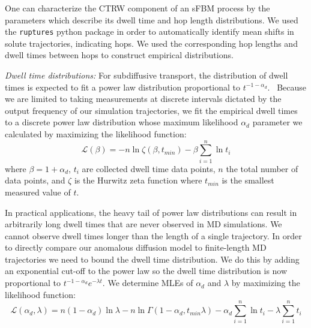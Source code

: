 \documentclass{article}
\begin{document}
  
  One can characterize the CTRW component of an sFBM process by the parameters which describe
  its dwell time and hop length distributions. We used the \texttt{ruptures} python
  package in order to automatically identify mean shifts in solute trajectories, 
  indicating hops.\cite{truong_ruptures:_2018} We used the corresponding hop lengths
  and dwell times between hops to construct empirical distributions.
  
  \textit{Dwell time distributions:} For subdiffusive transport, the distribution 
  of dwell times is expected to fit a power law distribution 
  proportional to $t^{-1-\alpha_d}$.~\cite{meroz_toolbox_2015}
  Because we are limited to taking measurements at discrete intervals dictated by the output 
  frequency of our simulation trajectories, we fit the empirical dwell times
  to a discrete power law distribution whose maximum likelihood $\alpha_d$ 
  parameter we calculated by maximizing the likelihood function: 
  \begin{equation}
	\mathcal{L}(\beta) = -n\ln \zeta(\beta, t_{min}) -
	\beta\sum_{i=1}^{n} \ln t_i 
  \label{eqn:powerlaw_likelihood}
  \end{equation}
  where $\beta = 1 + \alpha_d$, $t_i$ are collected dwell time data points,
  $n$ the total number of data points, and $\zeta$ is the Hurwitz zeta function
  where $t_{min}$ is the smallest measured value of	$t$.~\cite{clauset_power-law_2009}
  
  In practical applications, the heavy tail of power law distributions can result in 
  arbitrarily long dwell times that are never observed in MD simulations. We cannot
  observe dwell times longer than the length of a single trajectory. 
  In order to directly compare our anomalous diffusion model to finite-length MD 
  trajectories we need to bound the dwell time distribution. We do this by adding 
  an exponential cut-off to the power law so the dwell time distribution is 
  now proportional to $t^{-1 - \alpha_d}e^{-\lambda t}$.
  We determine MLEs of $\alpha_d$ and $\lambda$ by maximizing the likelihood function:~\cite{clauset_power-law_2009}
  \begin{equation}
    \mathcal{L}(\alpha_d, \lambda) = n(1 - \alpha_d)\ln\lambda - n\ln\Gamma(1 - \alpha_d, t_{min}\lambda) - \alpha_d\sum_{i=1}^{n}\ln t_i - \lambda\sum_{i=1}^n t_i
  \label{eqn:powerlaw_cutoff_likelihood}
  \end{equation}
  
\end{document}
